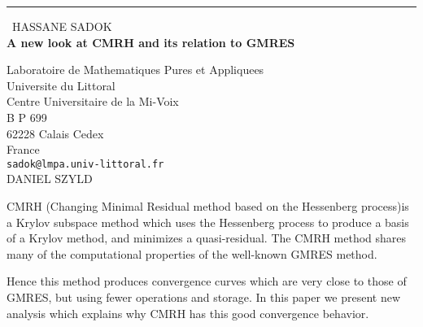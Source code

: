 \documentclass{report}
\begin{document}
\begin{center}
\rule{6in}{1pt} \
{\large HASSANE SADOK \\
{\bf A new look at CMRH and its relation to GMRES}}

Laboratoire de Mathematiques Pures et Appliquees \\ Universite du Littoral \\ Centre Universitaire de la Mi-Voix \\ B P 699 \\ 62228 Calais Cedex \\ France
\\
{\tt sadok@lmpa.univ-littoral.fr}\\
DANIEL SZYLD\end{center}

CMRH (Changing Minimal Residual method based on the Hessenberg process)is
a Krylov subspace method which uses the Hessenberg process to produce a
basis of a Krylov method, and minimizes a quasi-residual. The CMRH method
shares many of the computational properties of the well-known GMRES
method.

Hence this method produces convergence curves which are very close
to those of GMRES, but using fewer operations and storage.
In this paper we present new analysis which explains
why CMRH has this good convergence behavior.
\end{document}
